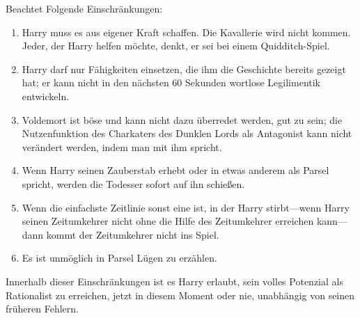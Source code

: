 {%
Beachtet Folgende Einschränkungen:
\begin{enumerate}
\item Harry muss es aus eigener Kraft schaffen. Die Kavallerie wird nicht kommen. Jeder, der Harry helfen möchte, denkt, er sei bei einem Quidditch-Spiel.
\item Harry darf nur Fähigkeiten einsetzen, die ihm die Geschichte bereits gezeigt hat; er kann nicht in den nächsten 60 Sekunden wortlose Legilimentik entwickeln.
\item Voldemort ist böse und kann nicht dazu überredet werden, gut zu sein; die Nutzenfunktion des Charkaters des Dunklen Lords als Antagonist kann nicht verändert werden, indem man mit ihm spricht.
\item Wenn Harry seinen Zauberstab erhebt oder in etwas anderem als Parsel spricht, werden die Todesser sofort auf ihn schießen.
\item Wenn die einfachste Zeitlinie sonst eine ist, in der Harry stirbt—wenn Harry seinen Zeitumkehrer nicht ohne die Hilfe des Zeitumkehrer erreichen kann—dann kommt der Zeitumkehrer nicht ins Spiel.
\item Es ist unmöglich in Parsel Lügen zu erzählen.
\end{enumerate}

Innerhalb dieser Einschränkungen ist es Harry erlaubt, sein volles Potenzial als Rationalist zu erreichen, jetzt in diesem Moment oder nie, unabhängig von seinen früheren Fehlern.

}
